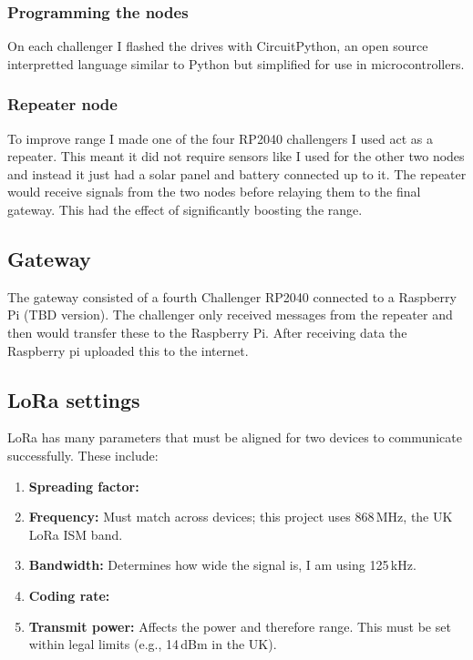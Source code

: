 \subsubsection{Programming the nodes}

On each challenger I flashed the drives with CircuitPython, an open source
interpretted language similar to Python but simplified for use in
microcontrollers.

\subsubsection{Repeater node}

To improve range I made one of the four RP2040 challengers I used act as a
repeater. This meant it did not require sensors like I used for the other two
nodes and instead it just had a solar panel and battery connected up to it. The
repeater would receive signals from the two nodes before relaying them to the
final gateway. This had the effect of significantly boosting the range.

\subsection{Gateway}

The gateway consisted of a fourth Challenger RP2040 connected to a Raspberry Pi
(TBD version). The challenger only received messages from the repeater and
then would transfer these to the Raspberry Pi. After receiving data the
Raspberry pi uploaded this to the internet.

\subsection{LoRa settings}

LoRa has many parameters that must be aligned for two devices to communicate successfully. These include:

\begin{enumerate}
  \item \textbf{Spreading factor:} 
  \item \textbf{Frequency:} Must match across devices; this project uses 868\,MHz, the UK LoRa ISM band.
  \item \textbf{Bandwidth:} Determines how wide the signal is, I am using 125\,kHz.
  \item \textbf{Coding rate:} 
  \item \textbf{Transmit power:} Affects the power and therefore range. This must be set within legal limits (e.g., 14\,dBm in the UK).
\end{enumerate}

